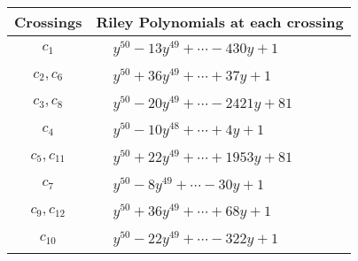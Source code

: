 \documentclass[1p]{elsarticle_modified}
\theoremstyle{definition}
\begin{document}
\begin{tabular}{m{50pt}|m{274pt}}
Crossings & \hspace{64pt}Riley Polynomials at each crossing \\
\hline $$\begin{aligned}c_{1}\end{aligned}$$&$\begin{aligned}
&y^{50}-13 y^{49}+\cdots-430 y+1
\end{aligned}$\\
\hline $$\begin{aligned}c_{2},c_{6}\end{aligned}$$&$\begin{aligned}
&y^{50}+36 y^{49}+\cdots+37 y+1
\end{aligned}$\\
\hline $$\begin{aligned}c_{3},c_{8}\end{aligned}$$&$\begin{aligned}
&y^{50}-20 y^{49}+\cdots-2421 y+81
\end{aligned}$\\
\hline $$\begin{aligned}c_{4}\end{aligned}$$&$\begin{aligned}
&y^{50}-10 y^{48}+\cdots+4 y+1
\end{aligned}$\\
\hline $$\begin{aligned}c_{5},c_{11}\end{aligned}$$&$\begin{aligned}
&y^{50}+22 y^{49}+\cdots+1953 y+81
\end{aligned}$\\
\hline $$\begin{aligned}c_{7}\end{aligned}$$&$\begin{aligned}
&y^{50}-8 y^{49}+\cdots-30 y+1
\end{aligned}$\\
\hline $$\begin{aligned}c_{9},c_{12}\end{aligned}$$&$\begin{aligned}
&y^{50}+36 y^{49}+\cdots+68 y+1
\end{aligned}$\\
\hline $$\begin{aligned}c_{10}\end{aligned}$$&$\begin{aligned}
&y^{50}-22 y^{49}+\cdots-322 y+1
\end{aligned}$\\
\hline
\end{tabular}\\~\\
\end{document}
